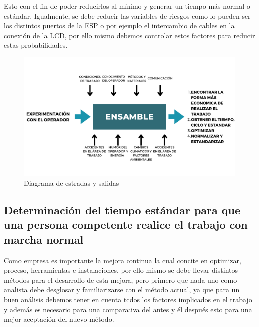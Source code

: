     
    Esto con el fin de poder reducirlos al mínimo y generar un tiempo más normal o estándar. Igualmente, se debe reducir las variables de riesgos como lo pueden ser los distintos puertos de la ESP o por ejemplo el intercambio de cables en la conexión de la LCD, por ello mismo debemos controlar estos factores para reducir estas probabilidades.
    
    \begin{figure}[H] 
        \centering
        \includegraphics[trim = {12mm 20mm 10mm 14mm},clip,scale=0.15]{22/Img/diagramaEntradasSalidas.pdf}
        \caption{Diagrama de estradas y salidas}
        \label{fig:diagrama}
    \end{figure}
    
    \subsection{Determinación del tiempo estándar para que una persona competente realice el trabajo con marcha normal}
    
    Como empresa es importante la mejora continua la cual concite en optimizar, proceso, herramientas e instalaciones, por ello mismo se debe llevar distintos métodos para el desarrollo de esta mejora, pero primero que nada uno como analista debe desglosar y familiarizarse con el método actual, ya que para un buen análisis debemos tener en cuenta todos los factores implicados en el trabajo y además es necesario para una comparativa del antes y él después esto para una mejor aceptación del nuevo método.
    
